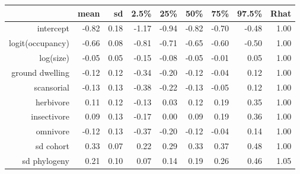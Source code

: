 \begin{table}[ht]
\centering
\begin{tabular}{rrrrrrrrr}
  \hline
 & mean & sd & 2.5\% & 25\% & 50\% & 75\% & 97.5\% & Rhat \\ 
  \hline
intercept & -0.82 & 0.18 & -1.17 & -0.94 & -0.82 & -0.70 & -0.48 & 1.00 \\ 
  logit(occupancy) & -0.66 & 0.08 & -0.81 & -0.71 & -0.65 & -0.60 & -0.50 & 1.00 \\ 
  log(size) & -0.05 & 0.05 & -0.15 & -0.08 & -0.05 & -0.01 & 0.05 & 1.00 \\ 
  ground dwelling & -0.12 & 0.12 & -0.34 & -0.20 & -0.12 & -0.04 & 0.12 & 1.00 \\ 
  scansorial & -0.13 & 0.13 & -0.38 & -0.22 & -0.13 & -0.05 & 0.12 & 1.00 \\ 
  herbivore & 0.11 & 0.12 & -0.13 & 0.03 & 0.12 & 0.19 & 0.35 & 1.00 \\ 
  insectivore & 0.09 & 0.13 & -0.17 & 0.00 & 0.09 & 0.19 & 0.36 & 1.00 \\ 
  omnivore & -0.12 & 0.13 & -0.37 & -0.20 & -0.12 & -0.04 & 0.14 & 1.00 \\ 
  sd cohort & 0.33 & 0.07 & 0.22 & 0.29 & 0.33 & 0.37 & 0.48 & 1.00 \\ 
  sd phylogeny & 0.21 & 0.10 & 0.07 & 0.14 & 0.19 & 0.26 & 0.46 & 1.05 \\ 
   \hline
\end{tabular}
\label{post_sum}
\end{table}

